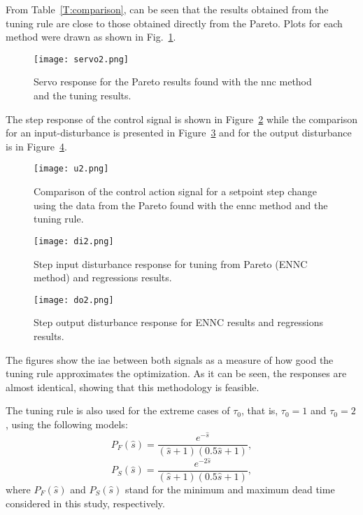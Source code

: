 From Table~\ref{T:comparison}, can be seen that the results obtained from the  tuning rule are close to those obtained directly from the Pareto. Plots for each method were drawn as shown in Fig.~\ref{F:firstsim}.
%
\begin{figure}[tb]
	\centering
	\texttt{[image: servo2.png]}
	\caption{Servo response for the Pareto results found with the \gls{nnc} method and the tuning results.}
	\label{F:firstsim}
\end{figure}
%
The step response of the control signal is shown in Figure~\ref{F:u1} while the comparison for an input-disturbance is presented in Figure~\ref{F:di1} and for the output disturbance is in Figure~\ref{F:do1}. 
%
\begin{figure}[tb]
	\centering
	\texttt{[image: u2.png]}
	\caption{Comparison of the control action  signal for a setpoint step change using the data from the Pareto found with the \gls{ennc} method and the tuning rule.}
	\label{F:u1}
\end{figure}
%
\begin{figure}[tb]
	\centering
	\texttt{[image: di2.png]}
	\caption{Step input disturbance response for tuning from Pareto (ENNC method) and regressions results.}
	\label{F:di1}
\end{figure}
%
\begin{figure}[tb]
	\centering
	\texttt{[image: do2.png]}
	\caption{Step output disturbance response for ENNC results and regressions results.}
	\label{F:do1}
\end{figure}
%
The figures show the \gls{iae} between both signals as a measure of how good the tuning rule approximates the optimization. As it can be seen, the responses are almost identical, showing that this methodology is feasible.

The tuning rule is also used for the extreme cases of $\tau_0$, that is, $\tau_0=1$ and $\tau_0=2$, using the following models:
%
\begin{equation}
P_F(\hat{s}) = \frac{e^{-\hat{s}}}{(\hat{s}+1)(0.5\hat{s}+1)},
\label{E:p2}
\end{equation}
%
\begin{equation}
P_S(\hat{s}) = \frac{e^{-2\hat{s}}}{(\hat{s}+1)(0.5\hat{s}+1)},
\label{E:p3}
\end{equation}
%
where $P_F(\hat{s})$ and $P_S(\hat{s})$ stand for the minimum and maximum  dead time considered in this study, respectively.

